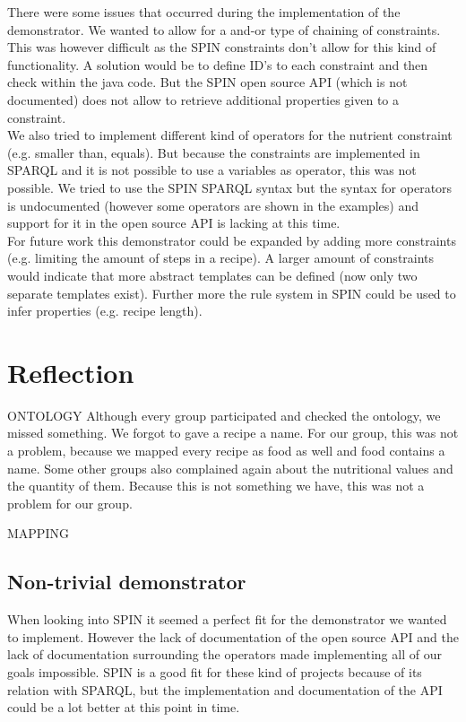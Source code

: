 There were some issues that occurred during the implementation of the demonstrator. We wanted to allow for a and-or type of chaining of constraints. This was however difficult as the SPIN constraints don't allow for this kind of functionality. A solution would be to define ID's to each constraint and then check within the java code. But the SPIN open source API (which is not documented) does not allow to retrieve additional properties given to a constraint.\\
We also tried to implement different kind of operators for the nutrient constraint (e.g. smaller than, equals). But because the constraints are implemented in SPARQL and it is not possible to use a variables as operator, this was not possible. We tried to use the SPIN SPARQL syntax but the syntax for operators is undocumented (however some operators are shown in the examples) and support for it in the open source API is lacking at this time.\\
For future work this demonstrator could be expanded by adding more constraints (e.g. limiting the amount of steps in a recipe). A larger amount of constraints would indicate that more abstract templates can be defined (now only two separate templates exist). Further more the rule system in SPIN could be used to infer properties (e.g. recipe length).

\section{Reflection}

ONTOLOGY
Although every group participated and checked the ontology, we missed something. We forgot to gave a recipe a name. For our group, this was not a problem, because we mapped every recipe as food as well and food contains a name. Some other groups also complained again about the nutritional values and the quantity of them. Because this is not something we have, this was not a problem for our group. 

MAPPING

\subsection{Non-trivial demonstrator}
When looking into SPIN it seemed a perfect fit for the demonstrator we wanted to implement. However the lack of documentation of the open source API and the lack of documentation surrounding the operators made implementing all of our goals impossible. SPIN is a good fit for these kind of projects because of its relation with SPARQL, but the implementation and documentation of the API could be a lot better at this point in time.

